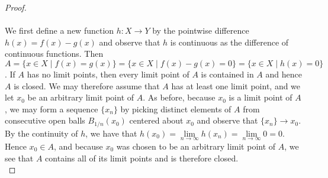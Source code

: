 \begin{proof}\ \\\\
    We first define a new function $h:X \to Y$ by the pointwise difference $h(x) = f(x) - g(x)$ and observe that $h$ is
    continuous as the difference of continuous functions. Then 
    $A = \{x \in X \mid f(x) = g(x)\} = \{x \in X \mid f(x) - g(x) = 0\} = \{x \in X \mid h(x) = 0\}$.
    If $A$ has no limit points, then every limit point of $A$ is contained in $A$ and hence $A$ is closed. We may 
    therefore assume that $A$ has at least one limit point, and we let $x_0$ be an arbitrary limit point of $A$. As 
    before, because $x_0$ is a limit point of $A$, we may form a sequence $\{x_n\}$ by picking distinct elements of $A$ 
    from consecutive open balls $B_{1/n}(x_0)$ centered about $x_0$ and observe that $\{x_n\} \to x_0$. By the 
    continuity of $h$, we have that $h(x_0) = \lim\limits_{n \to \infty}{h(x_n)} = \lim\limits_{n \to \infty}{0} = 0$.
    Hence $x_0 \in A$, and because $x_0$ was chosen to be an arbitrary limit point of $A$, we see that $A$ contains all
    of its limit points and is therefore closed.
    \ \\    
\end{proof}

\pagebreak
